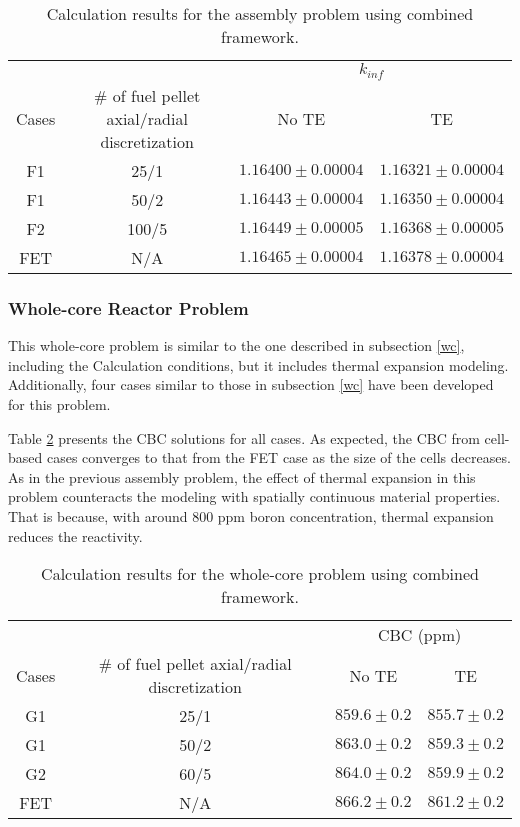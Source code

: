\begin{table}
    \centering
    \caption{Calculation results for the assembly problem using combined framework.}
    \label{tab431} 
    \begin{tabular}{| c | c | c | c | }
    \hline 
       &   & \multicolumn{2}{c|}{$k_{inf}$}       \\
    \cline{3-4}
     Cases & \# of fuel pellet axial/radial discretization & No TE & TE \\
     \hline
     F1     & 25/1  & $1.16400\pm0.00004$ & $1.16321\pm0.00004$      \\ \hline
     F1     & 50/2  & $1.16443\pm0.00004$ & $1.16350\pm0.00004$      \\ \hline
     F2     & 100/5 & $1.16449\pm0.00005$ & $1.16368\pm0.00005$      \\ \hline
     FET    & N/A   & $1.16465\pm0.00004$ & $1.16378\pm0.00004$      \\ \hline
    \end{tabular}
\end{table}

\subsubsection{Whole-core Reactor Problem}

This whole-core problem is similar to the one described in subsection \ref{wc}, including the Calculation conditions, but it includes thermal expansion modeling. Additionally, four cases similar to those in subsection \ref{wc} have been developed for this problem.

Table \ref{tab432a} presents the CBC solutions for all cases. As expected, the CBC from cell-based cases converges to that from the FET case as the size of the cells decreases. As in the previous assembly problem, the effect of thermal expansion in this problem counteracts the modeling with spatially continuous material properties. That is because, with around 800 ppm boron concentration, thermal expansion reduces the reactivity.

\begin{table}
    \centering
    \caption{Calculation results for the whole-core problem using combined framework.}
    \label{tab432a} 
    \begin{tabular}{| c | c | c | c | }
    \hline 
       &   & \multicolumn{2}{c|}{CBC (ppm)}       \\
    \cline{3-4}
     Cases & \# of fuel pellet axial/radial discretization & No TE & TE \\
     \hline
     G1     & 25/1  & $859.6\pm0.2$ & $855.7\pm0.2$      \\ \hline
     G1     & 50/2  & $863.0\pm0.2$ & $859.3\pm0.2$      \\ \hline
     G2     & 60/5  & $864.0\pm0.2$ & $859.9\pm0.2$      \\ \hline
     FET    & N/A   & $866.2\pm0.2$ & $861.2\pm0.2$      \\ \hline
    \end{tabular}
\end{table}

